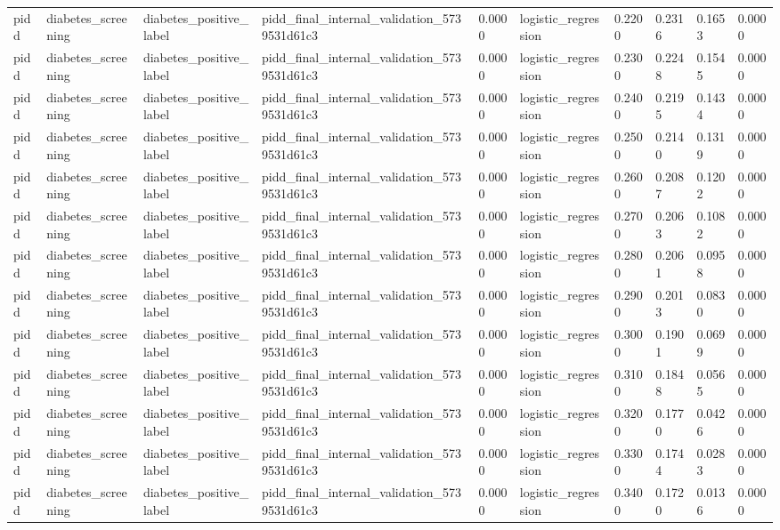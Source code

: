 \begin{tabular}{llllllllll}
pidd & diabetes\_screening & diabetes\_positive\_label & pidd\_final\_internal\_validation\_5739531d61c3 & 0.0000 & logistic\_regression & 0.2200 & 0.2316 & 0.1653 & 0.0000 \\
pidd & diabetes\_screening & diabetes\_positive\_label & pidd\_final\_internal\_validation\_5739531d61c3 & 0.0000 & logistic\_regression & 0.2300 & 0.2248 & 0.1545 & 0.0000 \\
pidd & diabetes\_screening & diabetes\_positive\_label & pidd\_final\_internal\_validation\_5739531d61c3 & 0.0000 & logistic\_regression & 0.2400 & 0.2195 & 0.1434 & 0.0000 \\
pidd & diabetes\_screening & diabetes\_positive\_label & pidd\_final\_internal\_validation\_5739531d61c3 & 0.0000 & logistic\_regression & 0.2500 & 0.2140 & 0.1319 & 0.0000 \\
pidd & diabetes\_screening & diabetes\_positive\_label & pidd\_final\_internal\_validation\_5739531d61c3 & 0.0000 & logistic\_regression & 0.2600 & 0.2087 & 0.1202 & 0.0000 \\
pidd & diabetes\_screening & diabetes\_positive\_label & pidd\_final\_internal\_validation\_5739531d61c3 & 0.0000 & logistic\_regression & 0.2700 & 0.2063 & 0.1082 & 0.0000 \\
pidd & diabetes\_screening & diabetes\_positive\_label & pidd\_final\_internal\_validation\_5739531d61c3 & 0.0000 & logistic\_regression & 0.2800 & 0.2061 & 0.0958 & 0.0000 \\
pidd & diabetes\_screening & diabetes\_positive\_label & pidd\_final\_internal\_validation\_5739531d61c3 & 0.0000 & logistic\_regression & 0.2900 & 0.2013 & 0.0830 & 0.0000 \\
pidd & diabetes\_screening & diabetes\_positive\_label & pidd\_final\_internal\_validation\_5739531d61c3 & 0.0000 & logistic\_regression & 0.3000 & 0.1901 & 0.0699 & 0.0000 \\
pidd & diabetes\_screening & diabetes\_positive\_label & pidd\_final\_internal\_validation\_5739531d61c3 & 0.0000 & logistic\_regression & 0.3100 & 0.1848 & 0.0565 & 0.0000 \\
pidd & diabetes\_screening & diabetes\_positive\_label & pidd\_final\_internal\_validation\_5739531d61c3 & 0.0000 & logistic\_regression & 0.3200 & 0.1770 & 0.0426 & 0.0000 \\
pidd & diabetes\_screening & diabetes\_positive\_label & pidd\_final\_internal\_validation\_5739531d61c3 & 0.0000 & logistic\_regression & 0.3300 & 0.1744 & 0.0283 & 0.0000 \\
pidd & diabetes\_screening & diabetes\_positive\_label & pidd\_final\_internal\_validation\_5739531d61c3 & 0.0000 & logistic\_regression & 0.3400 & 0.1720 & 0.0136 & 0.0000 \\

\end{tabular}
